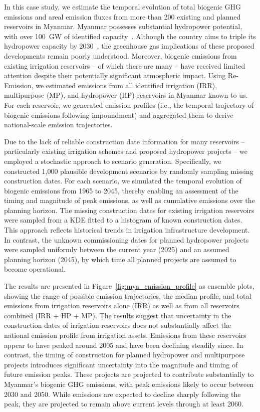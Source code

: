 \documentclass[final,1p,times]{elsarticle}
\begin{document}
In this case study, we estimate the temporal evolution of total biogenic \ac{GHG} emissions and areal emission fluxes from more than 200 existing and planned reservoirs in Myanmar. 
Myanmar possesses substantial hydropower potential, with over 100~GW of identified capacity~\citep{EA_Myanmar}.
Although the country aims to triple its hydropower capacity by 2030~\citep{Aung2020}, the greenhouse gas implications of these proposed developments remain poorly understood. 
Moreover, biogenic emissions from existing irrigation reservoirs -- of which there are many -- have received limited attention despite their potentially significant atmospheric impact.
Using Re-Emission, we estimated emissions from all identified irrigation (IRR), multipurpose (MP), and hydropower (HP) reservoirs in Myanmar known to us. 
For each reservoir, we generated emission profiles (i.e., the temporal trajectory of biogenic emissions following impoundment) and aggregated them to derive national-scale emission trajectories.

Due to the lack of reliable construction date information for many reservoirs -- particularly existing irrigation schemes and proposed hydropower projects -- we employed a stochastic approach to scenario generation. 
Specifically, we constructed 1,000 plausible development scenarios by randomly sampling missing construction dates.
For each scenario, we simulated the temporal evolution of biogenic emissions from 1965 to 2045, thereby enabling an assessment of the timing and magnitude of peak emissions, as well as cumulative emissions over the planning horizon.
The missing construction dates for existing irrigation reservoirs were sampled from a \acf{KDE} fitted to a histogram of known construction dates.
This approach reflects historical trends in irrigation infrastructure development.
In contrast, the unknown commissioning dates for planned hydropower projects were sampled uniformly between the current year (2025) and an assumed planning horizon (2045), by which time all planned projects are assumed to become operational.

The results are presented in Figure~\ref{fig:mya_emission_profile} as ensemble plots, showing the range of possible emission trajectories, the median profile, and total emissions from irrigation reservoirs alone (IRR) as well as from all reservoirs combined (IRR + HP + MP). The results suggest that uncertainty in the construction dates of irrigation reservoirs does not substantially affect the national emission profile from irrigation assets. Emissions from these reservoirs appear to have peaked around 2005 and have been declining steadily since.
In contrast, the timing of construction for planned hydropower and multipurpose projects introduces significant uncertainty into the magnitude and timing of future emission peaks.
These projects are projected to contribute substantially to Myanmar’s biogenic \ac{GHG} emissions, with peak emissions likely to occur between 2030 and 2050.
While emissions are expected to decline sharply following the peak, they are projected to remain above current levels through at least 2060.
\end{document}
